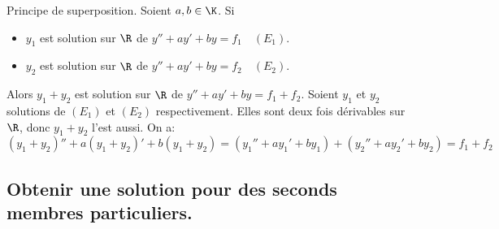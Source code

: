 \documentclass[11pt]{article}
\begin{document}
\begin{prop}{Principe de superposition.}{}
    Soient $a,b\in\K$. Si
    \begin{itemize}
        \item $y_1$ est solution sur $\R$ de $y''+ay'+by=f_1\quad(E_1)$.
        \item $y_2$ est solution sur $\R$ de $y''+ay'+by=f_2\quad(E_2)$.
    \end{itemize}
    Alors $y_1+y_2$ est solution sur $\R$ de $y''+ay'+by=f_1+f_2$.
    \tcblower
    Soient $y_1$ et $y_2$ solutions de $(E_1)$ et $(E_2)$ respectivement. Elles sont deux fois dérivables sur $\R$, donc $y_1+y_2$ l'est aussi. On a:
    \begin{equation*}
        (y_1+y_2)''+a(y_1+y_2)'+b(y_1+y_2)=(y_1''+ay_1'+by_1)+(y_2''+ay_2'+by_2)=f_1+f_2
    \end{equation*}
\end{prop}

\subsection{Obtenir une solution pour des seconds membres particuliers.}
\end{document}
